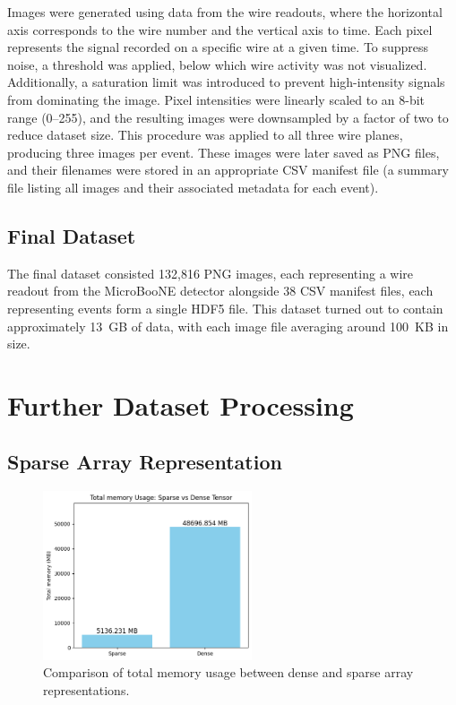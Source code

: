 \documentclass{pracalicmgr}
\begin{document}
Images were generated using data from the wire readouts, where the horizontal axis corresponds to the wire number and the vertical axis to time. Each pixel represents the signal recorded on a specific wire at a given time. To suppress noise, a threshold was applied, below which wire activity was not visualized. Additionally, a saturation limit was introduced to prevent high-intensity signals from dominating the image. Pixel intensities were linearly scaled to an 8-bit range (0--255), and the resulting images were downsampled by a factor of two to reduce dataset size. This procedure was applied to all three wire planes, producing three images per event. These images were later saved as PNG files, and their filenames were stored in an appropriate CSV manifest file (a summary file listing all images and their associated metadata for each event).

\subsection{Final Dataset}

The final dataset consisted 132,816 PNG images, each representing a wire readout from the MicroBooNE detector alongside 38 CSV manifest files, each representing events form a single HDF5 file. This dataset turned out to contain approximately 13~GB of data, with each image file averaging around 100~KB in size.

\section{Further Dataset Processing}

\subsection{Sparse Array Representation}

\begin{figure}[H]
    \centering
    \includegraphics[width=0.55\textwidth]{src/totalSparseDense.png}
    \caption{Comparison of total memory usage between dense and sparse array representations.}
    \label{fig:memRedTot}
\end{figure}
\end{document}
